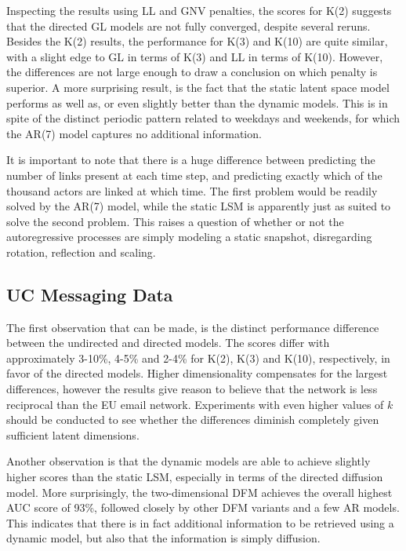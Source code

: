     Inspecting the results using LL and GNV penalties, the scores for K(2) suggests that the directed GL models are not fully converged, despite several reruns. Besides the K(2) results, the performance for K(3) and K(10) are quite similar, with a slight edge to GL in terms of K(3) and LL in terms of K(10). However, the differences are not large enough to draw a conclusion on which penalty is superior. A more surprising result, is the fact that the static latent space model performs as well as, or even slightly better than the dynamic models. This is in spite of the distinct periodic pattern related to weekdays and weekends, for which the AR(7) model captures no additional information. 
    
    It is important to note that there is a huge difference between predicting the number of links present at each time step, and predicting exactly which of the thousand actors are linked at which time. The first problem would be readily solved by the AR(7) model, while the static LSM is apparently just as suited to solve the second problem. This raises a question of whether or not the autoregressive processes are simply modeling a static snapshot, disregarding rotation, reflection and scaling.
    
\subsection{UC Messaging Data}

    The first observation that can be made, is the distinct performance difference between the undirected and directed models. The scores differ with approximately 3-10\%, 4-5\% and 2-4\% for K(2), K(3) and K(10), respectively, in favor of the directed models. 
    Higher dimensionality compensates for the largest differences, however the results give reason to believe that the network is less reciprocal than the EU email network.
    Experiments with even higher values of $k$ should be conducted to see whether the differences diminish completely given sufficient latent dimensions.
    
    Another observation is that the dynamic models are able to achieve slightly higher scores than the static LSM, especially in terms of the directed diffusion model. More surprisingly, the two-dimensional DFM achieves the overall highest AUC score of 93\%, followed closely by other DFM variants and a few AR models. This indicates that there is in fact additional information to be retrieved using a dynamic model, but also that the information is simply diffusion.
    

